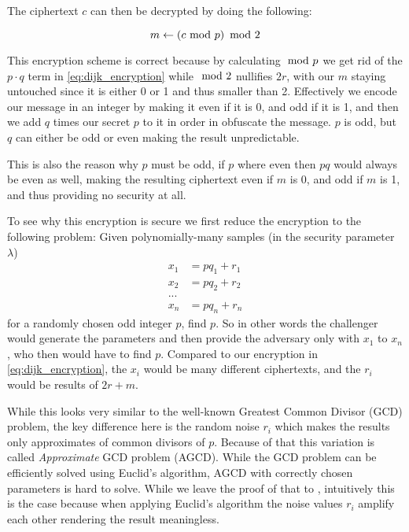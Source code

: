 The ciphertext $c$ can then be decrypted by doing the following:

\begin{equation}
    m \leftarrow \left( c \ \mathrm{mod}\ p \right) \ \mathrm{mod}\ 2
\end{equation}

This encryption scheme is correct because by calculating $\ \mathrm{mod}\ p$ we get rid of the $p \cdot q$ term in \ref{eq:dijk_encryption} while $\ \mathrm{mod}\ 2$ nullifies $2r$, with our $m$ staying untouched since it is either 0 or 1 and thus smaller than 2. Effectively we encode our message in an integer by making it even if it is 0, and odd if it is 1, and then we add $q$ times our secret $p$ to it in order in obfuscate the message. $p$ is odd, but $q$ can either be odd or even making the result unpredictable.

\begin{remark}
    This is also the reason why $p$ must be odd, if $p$ where even then $pq$ would always be even as well, making the resulting ciphertext even if $m$ is 0, and odd if $m$ is 1, and thus providing no security at all.
\end{remark}

To see why this encryption is secure we first reduce the encryption to the following problem: Given polynomially-many samples (in the security parameter $\lambda$)
\begin{equation}
    \begin{aligned}
        x_1 &= p q_1 + r_1 \\
        x_2 &= p q_2 + r_2 \\
        ... &\\
        x_n &= p q_n + r_n
    \end{aligned}
\end{equation}
for a randomly chosen odd integer $p$, find $p$. So in other words the challenger would generate the parameters and then provide the adversary only with $x_1$ to $x_n$, who then would have to find $p$. Compared to our encryption in \ref{eq:dijk_encryption}, the $x_i$ would be many different ciphertexts, and the $r_i$ would be results of $2r + m$.

While this looks very similar to the well-known Greatest Common Divisor (GCD) problem, the key difference here is the random noise $r_i$ which makes the results only approximates of common divisors of $p$. Because of that this variation is called \emph{Approximate} GCD problem (AGCD). While the GCD problem can be efficiently solved using Euclid's algorithm, AGCD with correctly chosen parameters is hard to solve. While we leave the proof of that to \cite{van_dijk_fully_2010}, intuitively this is the case because when applying Euclid's algorithm the noise values $r_i$ amplify each other rendering the result meaningless.

